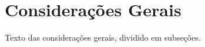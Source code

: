 \chapter{Considerações Gerais}
\label{cap:02}

Texto das considerações gerais, dividido em subseções. %









